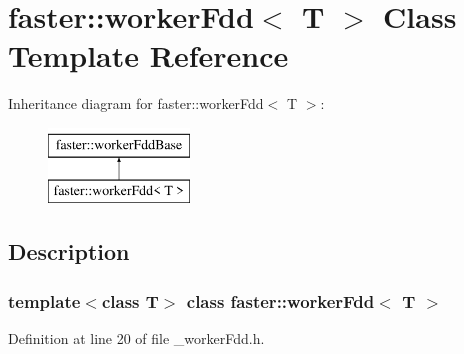 \hypertarget{classfaster_1_1workerFdd}{}\section{faster\+:\+:worker\+Fdd$<$ T $>$ Class Template Reference}
\label{classfaster_1_1workerFdd}
Inheritance diagram for faster\+:\+:worker\+Fdd$<$ T $>$\+:\begin{figure}[H]
\begin{center}
\leavevmode
\includegraphics[height=2.000000cm]{classfaster_1_1workerFdd}
\end{center}
\end{figure}


\subsection{Description}
\subsubsection*{template$<$class T$>$\newline
class faster\+::worker\+Fdd$<$ T $>$}



Definition at line 20 of file \+\_\+worker\+Fdd.\+h.

